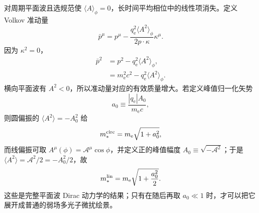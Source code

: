 \begin{derivation}
对周期平面波且选规范使 $\langle A\rangle_\phi=0$，长时间平均相位中的线性项消失。定义 Volkov 准动量
\begin{equation*}
 {
 \bar p^\mu
 =p^\mu
 -\frac{q_{\mathrm e}^2\langle A^2\rangle_\phi}{2p\cdot\kappa}\kappa^\mu.}
 \end{equation*}
因为 $\kappa^2=0$，
\begin{align*}
 \bar p^2
 &=p^2-q_{\mathrm e}^2\langle A^2\rangle_\phi,\\
 &=m_{\mathrm e}^2c^2-q_{\mathrm e}^2\langle A^2\rangle_\phi.
\end{align*}
横向平面波有 $A^2<0$，所以准动量对应的有效质量增大。若定义峰值归一化矢势
\begin{equation*}
 a_0\equiv\frac{|q_{\mathrm e}|A_0}{m_{\mathrm e} c},
\end{equation*}
则圆偏振的 $\langle A^2\rangle=-A_0^2$ 给
\begin{equation*}
 {m_*^{\rm circ}=m_{\mathrm e}\sqrt{1+a_0^2},}
\end{equation*}
而线偏振可取 $A^\mu(\phi)=\mathcal A^\mu\cos\phi$，并定义正的峰值幅度 $A_0\equiv\sqrt{-\mathcal A^2}$；于是 $\langle A^2\rangle=\mathcal A^2/2=-A_0^2/2$，故
\begin{equation*}
 {m_*^{\rm lin}=m_{\mathrm e}\sqrt{1+\frac{a_0^2}{2}}.}
 \end{equation*}
这些是完整平面波 Dirac 动力学的结果；只有在随后再取 $a_0\ll1$ 时，才可以把它展开成普通的弱场多光子微扰绘景。
\end{derivation}
